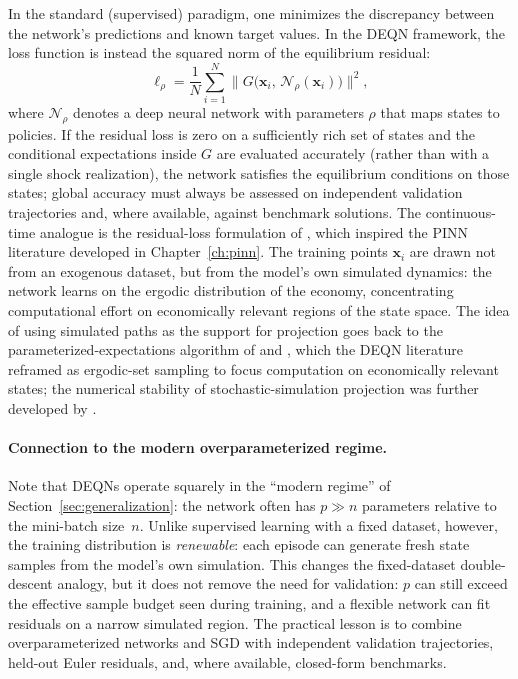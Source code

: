 \documentclass[11pt,a4paper]{report}
\newcommand{\x}{\bm{x}}
\begin{document}
In the standard (supervised) paradigm, one minimizes the discrepancy between the network's predictions and known target values.  In the DEQN framework, the loss function is instead the squared norm of the equilibrium residual:
\begin{equation}
\boxed{
\ell_\rho = \frac{1}{N} \sum_{i=1}^{N} \bigl\| G\bigl(\x_i,\, \mathcal{N}_\rho(\x_i)\bigr) \bigr\|^2,
}
\label{eq:deqn_loss}
\end{equation}
where $\mathcal{N}_\rho$ denotes a deep neural network with parameters $\rho$ that maps states to policies.  If the residual loss is zero on a sufficiently rich set of states and the conditional expectations inside $G$ are evaluated accurately (rather than with a single shock realization), the network satisfies the equilibrium conditions on those states; global accuracy must always be assessed on independent validation trajectories and, where available, against benchmark solutions.  The continuous-time analogue is the residual-loss formulation of \citet{raissi2019physics}, which inspired the PINN literature developed in Chapter~\ref{ch:pinn}.  The training points $\x_i$ are drawn not from an exogenous dataset, but from the model's own simulated dynamics: the network learns on the ergodic distribution of the economy, concentrating computational effort on economically relevant regions of the state space.  The idea of using simulated paths as the support for projection goes back to the parameterized-expectations algorithm of \citet{marcet1988pea} and \citet{marcet_marshall:94}, which the DEQN literature reframed as ergodic-set sampling to focus computation on economically relevant states; the numerical stability of stochastic-simulation projection was further developed by \citet{judd2011numerically}.

\paragraph{Connection to the modern overparameterized regime.}
Note that DEQNs operate squarely in the ``modern regime'' of Section~\ref{sec:generalization}: the network often has $p \gg n$ parameters relative to the mini-batch size~$n$.  Unlike supervised learning with a fixed dataset, however, the training distribution is \emph{renewable}: each episode can generate fresh state samples from the model's own simulation.  This changes the fixed-dataset double-descent analogy, but it does not remove the need for validation: $p$ can still exceed the effective sample budget seen during training, and a flexible network can fit residuals on a narrow simulated region.  The practical lesson is to combine overparameterized networks and SGD with independent validation trajectories, held-out Euler residuals, and, where available, closed-form benchmarks.
\end{document}

